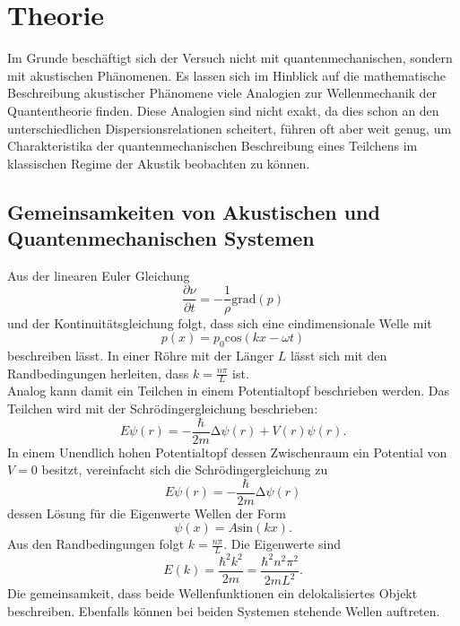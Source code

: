 \section{Theorie}
Im Grunde beschäftigt sich der Versuch nicht mit quantenmechanischen,
sondern mit akustischen Phänomenen. Es lassen sich im Hinblick auf die mathematische
Beschreibung akustischer Phänomene viele Analogien zur Wellenmechanik der Quantentheorie finden.
Diese Analogien sind nicht exakt, da dies schon an den unterschiedlichen Dispersionsrelationen scheitert,
führen oft aber weit genug, um Charakteristika der quantenmechanischen Beschreibung
eines Teilchens im klassischen Regime der Akustik beobachten zu können.
\subsection{Gemeinsamkeiten von Akustischen und Quantenmechanischen Systemen}
Aus der linearen Euler Gleichung
\begin{equation}
  \frac{\partial \nu}{\partial t}=-\frac{1}{\rho}\text{grad}(p)
\end{equation}
und der Kontinuitätsgleichung folgt, dass sich eine eindimensionale Welle mit
\begin{equation}
  p(x)=p_0\text{cos}(kx-\omega t)
\end{equation}
beschreiben lässt. In einer Röhre mit der Länger $L$ lässt sich mit den Randbedingungen herleiten, dass
$k=\frac{n\pi}{L}$ ist.\\
Analog kann damit ein Teilchen in einem Potentialtopf beschrieben werden. Das Teilchen
wird mit der Schrödingergleichung beschrieben:
\begin{equation}
  E\psi(r)=-\frac{\hbar}{2m}\increment\psi(r)+V(r)\psi(r).
\end{equation}
In einem Unendlich hohen Potentialtopf dessen Zwischenraum ein Potential von $V=0$ besitzt,
vereinfacht sich die Schrödingergleichung zu
\begin{equation}
  E\psi(r)=-\frac{\hbar}{2m}\increment\psi(r)
\end{equation}
dessen Lösung für die Eigenwerte Wellen der Form
\begin{equation}
  \psi(x)=A\text{sin}(kx).
\end{equation}
Aus den Randbedingungen folgt $k=\frac{n\pi}{L}$. Die Eigenwerte sind
\begin{equation}
  E(k)=\frac{\hbar^2 k^2}{2m}=\frac{\hbar^2n^2\pi^2}{2mL^2}.
\end{equation}
Die gemeinsamkeit, dass beide Wellenfunktionen ein delokalisiertes Objekt beschreiben.
Ebenfalls können bei beiden Systemen stehende Wellen auftreten.
